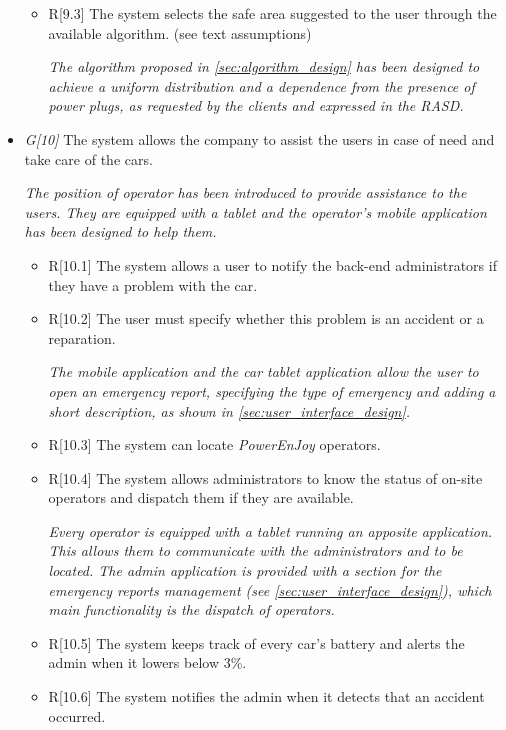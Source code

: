 \begin{itemize}
\begin{itemize}
		\item R[9.3] The system selects the safe area suggested to the user through the available algorithm. (see text assumptions)

			\textit{The algorithm proposed in \autoref{sec:algorithm_design} has been designed to achieve a uniform distribution and a dependence from the presence of power plugs, as requested by the clients and expressed in the RASD.}

	\end{itemize}
	
\item \textit{G[10]} The system allows the company to assist the users in case of need and take care of the cars.

	\textit{The position of operator has been introduced to provide assistance to the users. They are equipped with a tablet and the operator's mobile application has been designed to help them.}

	\begin{itemize}
		\item R[10.1] The system allows a user to notify the back-end administrators if they have a problem with the car.
		\item R[10.2] The user must specify whether this problem is an accident or a reparation.

			\textit{The mobile application and the car tablet application allow the user to open an emergency report, specifying the type of emergency and adding a short description, as shown in \autoref{sec:user_interface_design}.}

		\item R[10.3] The system can locate \textit{PowerEnJoy} operators. 
		\item R[10.4] The system allows administrators to know the status of on-site operators and dispatch them if they are available.

			\textit{Every operator is equipped with a tablet running an apposite application. This allows them to communicate with the administrators and to be located. The admin application is provided with a section for the emergency reports management (see \autoref{sec:user_interface_design}), which main functionality is the dispatch of operators.}

		\item R[10.5] The system keeps track of every car's battery and alerts the admin when it lowers below 3\%. 
		\item R[10.6] The system notifies the admin when it detects that an accident occurred.


\end{itemize}
\end{itemize}

